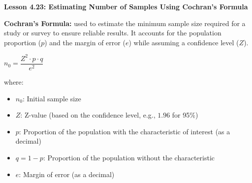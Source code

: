 \begin{center}
\textbf{Lesson 4.23: Estimating Number of Samples Using Cochran's Formula}
\end{center}

\vspace*{-1.5ex}

\noindent\textbf{Cochran’s Formula:} used to estimate the minimum sample size required for a study or survey to ensure reliable results. It accounts for the population proportion (\(p\)) and the margin of error (\(e\)) while assuming a confidence level (\(Z\)).

{\centering $ n_0 = \dfrac{Z^2 \cdot p \cdot q}{e^2} $\par}

\noindent where:
\begin{itemize}
    \item \(n_0\): Initial sample size
    \item \(Z\): Z-value (based on the confidence level, e.g., \(1.96\) for 95\%)
    \item \(p\): Proportion of the population with the characteristic of interest (as a decimal)
    \item \(q = 1 - p\): Proportion of the population without the characteristic
    \item \(e\): Margin of error (as a decimal)
\end{itemize}

